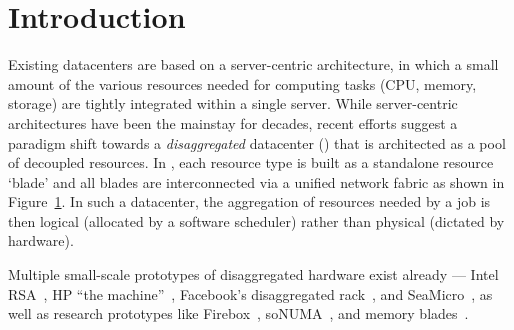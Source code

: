 \vspace{-0.1in}
\section{Introduction}
\vspace{-0.05in}
\label{sec:intro}
Existing datacenters are based on a server-centric architecture, in which a small amount of the various resources needed for computing tasks (CPU, memory, storage) are tightly integrated within a single server. While server-centric architectures have been the mainstay for decades, recent efforts suggest a paradigm shift towards a {\em disaggregated} datacenter (\dis) that is architected as a pool of decoupled resources. In \dis, each resource type is built as a standalone resource `blade' and all blades are interconnected via a unified network fabric as shown in Figure~\ref{fig:dc}. In such a datacenter, the aggregation of resources needed by a job is then logical (allocated by a software scheduler) rather than physical (dictated by hardware).

Multiple small-scale prototypes of disaggregated hardware exist already --- Intel RSA~\cite{rsa}, HP ``the machine''~\cite{hptm}, Facebook's disaggregated rack~\cite{fdr}, and SeaMicro~\cite{seamicro}, as well as research prototypes like Firebox~\cite{firebox}, soNUMA~\cite{sonuma}, and memory blades~\cite{ddcHwDesign1}.

\begin{figure}[!t]
\centering 
{}
\hfill
{}
\label{fig:dc}
\end{figure}


